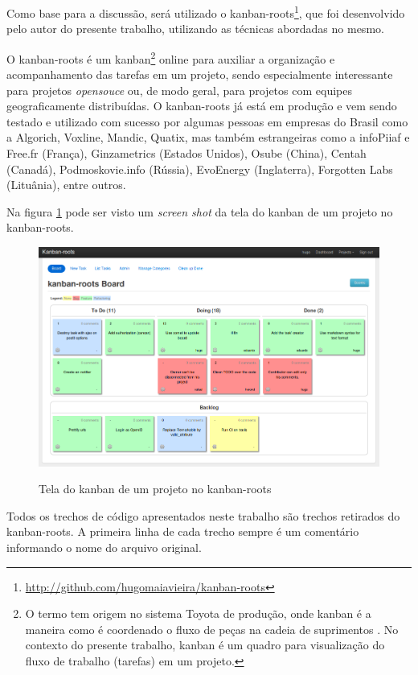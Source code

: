 Como base para a discussão, será utilizado o kanban-roots\footnote{\url{http://github.com/hugomaiavieira/kanban-roots}}, que foi desenvolvido pelo autor do presente trabalho, utilizando as técnicas abordadas no mesmo.

O kanban-roots é um kanban\footnote{O termo tem origem no sistema Toyota de produção, onde kanban é a maneira como é coordenado o fluxo de peças na cadeia de suprimentos  \cite{AMaquinaQueMudouOMundo}. No contexto do presente trabalho, kanban é um quadro para visualização do fluxo de trabalho (tarefas) em um projeto.} online para auxiliar a organização e acompanhamento das tarefas em um projeto, sendo especialmente interessante para projetos \textit{opensouce} ou, de modo geral, para projetos com equipes geograficamente distribuídas. O kanban-roots já está em produção e vem sendo testado e utilizado com sucesso por algumas pessoas em empresas do Brasil como a Algorich, Voxline, Mandic, Quatix, mas também estrangeiras como a infoPiiaf e Free.fr (França), Ginzametrics (Estados Unidos), Osube (China), Centah (Canadá), Podmoskovie.info (Rússia), EvoEnergy (Inglaterra), Forgotten Labs (Lituânia), entre outros.

Na figura \ref{img:tela_kaban_roots} pode ser visto um \textit{screen shot} da tela do kanban de um projeto no kanban-roots.

\begin{figure}[h]
  \center
  \caption{Tela do kanban de um projeto no kanban-roots}
  \includegraphics[scale=0.45]{images/kanban-roots}
  \label{img:tela_kaban_roots}
\end{figure}

Todos os trechos de código apresentados neste trabalho são trechos retirados do kanban-roots. A primeira linha de cada trecho sempre é um comentário informando o nome do arquivo original.

